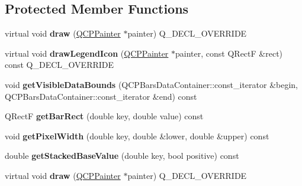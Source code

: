 \subsection*{Protected Member Functions}
\begin{DoxyCompactItemize}
\item 
virtual void {\bfseries draw} (\hyperlink{class_q_c_p_painter}{Q\+C\+P\+Painter} $\ast$painter) Q\+\_\+\+D\+E\+C\+L\+\_\+\+O\+V\+E\+R\+R\+I\+DE\hypertarget{class_q_c_p_bars_aa267c20650d55084c3f47cb2f8fac9dc}{}\label{class_q_c_p_bars_aa267c20650d55084c3f47cb2f8fac9dc}

\item 
virtual void {\bfseries draw\+Legend\+Icon} (\hyperlink{class_q_c_p_painter}{Q\+C\+P\+Painter} $\ast$painter, const Q\+RectF \&rect) const Q\+\_\+\+D\+E\+C\+L\+\_\+\+O\+V\+E\+R\+R\+I\+DE\hypertarget{class_q_c_p_bars_aee7c3e1763fd6b504c45baa8775be7b7}{}\label{class_q_c_p_bars_aee7c3e1763fd6b504c45baa8775be7b7}

\item 
void {\bfseries get\+Visible\+Data\+Bounds} (Q\+C\+P\+Bars\+Data\+Container\+::const\+\_\+iterator \&begin, Q\+C\+P\+Bars\+Data\+Container\+::const\+\_\+iterator \&end) const \hypertarget{class_q_c_p_bars_ac7bd86184d5baad410cd0d9c5c07f126}{}\label{class_q_c_p_bars_ac7bd86184d5baad410cd0d9c5c07f126}

\item 
Q\+RectF {\bfseries get\+Bar\+Rect} (double key, double value) const \hypertarget{class_q_c_p_bars_a2d279b96f3d8385b865ff7c11c1c608a}{}\label{class_q_c_p_bars_a2d279b96f3d8385b865ff7c11c1c608a}

\item 
void {\bfseries get\+Pixel\+Width} (double key, double \&lower, double \&upper) const \hypertarget{class_q_c_p_bars_a794eefe4fb29b9b40583654ccbf460dc}{}\label{class_q_c_p_bars_a794eefe4fb29b9b40583654ccbf460dc}

\item 
double {\bfseries get\+Stacked\+Base\+Value} (double key, bool positive) const \hypertarget{class_q_c_p_bars_ae9b0c2fad9f29030c84bb6e62a4b605f}{}\label{class_q_c_p_bars_ae9b0c2fad9f29030c84bb6e62a4b605f}

\item 
virtual void {\bfseries draw} (\hyperlink{class_q_c_p_painter}{Q\+C\+P\+Painter} $\ast$painter) Q\+\_\+\+D\+E\+C\+L\+\_\+\+O\+V\+E\+R\+R\+I\+DE\hypertarget{class_q_c_p_bars_a532b0ee9b17ddc76ef089bae8c37eee7}{}\label{class_q_c_p_bars_a532b0ee9b17ddc76ef089bae8c37eee7}


\end{DoxyCompactItemize}
